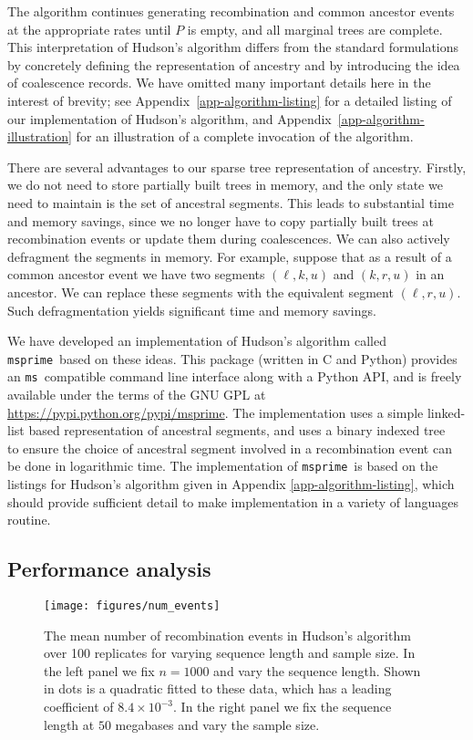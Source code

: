 \documentclass[10pt]{article}
\newcommand{\ms}[0]{\texttt{ms}}
\newcommand{\msprime}[0]{\texttt{msprime}}
\begin{document}
The algorithm continues generating recombination and common ancestor
events at the appropriate rates until $P$ is empty, and all marginal trees are
complete. This interpretation of Hudson's algorithm differs from the standard
formulations~\citep{h83b,h90,mc05} by concretely defining the representation of
ancestry and by introducing the idea of coalescence records. We have omitted
many important details here in the interest of brevity; see
Appendix~\ref{app-algorithm-listing} for a detailed listing of our
implementation of Hudson's algorithm, and
Appendix~\ref{app-algorithm-illustration} for an illustration of a complete
invocation of the algorithm.

There are several advantages to our sparse tree representation of ancestry.
Firstly, we do not need to store partially built trees in memory, and the only
state we need to maintain is the set of ancestral segments. This leads to
substantial time and memory savings, since we no longer have to copy partially
built trees at recombination events or update them during coalescences. We can
also actively defragment the segments in memory. For example, suppose that as a
result of a common ancestor event we have two segments $(\ell, k, u)$ and $(k,
r, u)$ in an ancestor. We can replace these segments with the equivalent
segment $(\ell, r, u)$. Such defragmentation yields significant time and memory
savings.

We have developed an implementation of Hudson's algorithm called \msprime\
based on these ideas.  This package (written in C and Python) provides an \ms\
compatible command line interface along with a Python API, and is freely
available under the terms of the GNU GPL at
\url{https://pypi.python.org/pypi/msprime}. The implementation uses a simple
linked-list based representation of ancestral segments, and uses a binary
indexed tree~\citep{f94,f95} to ensure the choice of ancestral segment involved
in a recombination event can be done in logarithmic time.  The implementation
of \msprime\ is based on the listings for Hudson's algorithm given in Appendix
\ref{app-algorithm-listing}, which should provide sufficient detail to make
implementation in a variety of languages routine.

\subsection{Performance analysis}
\label{sec-simulation-performance}

\begin{figure}
    \begin{center}
        \texttt{[image: figures/num\_events]}
    \end{center}
    \caption{\label{fig-algorithm-complexity} The mean number of
        recombination events in Hudson's algorithm over 100 replicates
        for varying sequence length and sample size. In the left panel we fix
        $n = 1000$ and vary the sequence length. Shown in dots is
        a quadratic fitted to these data, which has a
        leading coefficient of $8.4 \times 10^{-3}$.
        In the right panel
        we fix the sequence length at $50$ megabases and vary the sample
        size. }
\end{figure}
\end{document}
